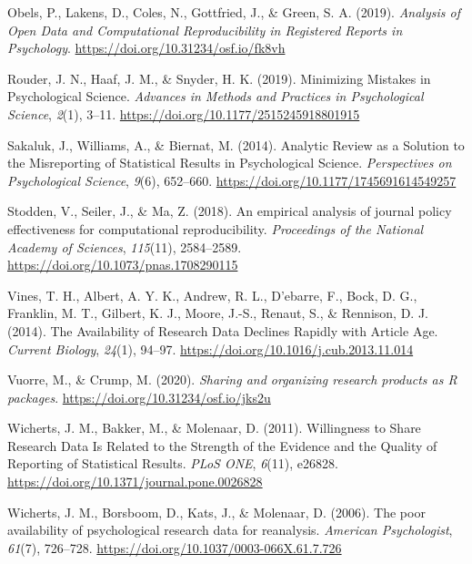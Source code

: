 \documentclass[english,,man,floatsintext]{apa6}
\begin{document}
\leavevmode\hypertarget{ref-obels2019}{}%
Obels, P., Lakens, D., Coles, N., Gottfried, J., \& Green, S. A. (2019). \emph{Analysis of Open Data and Computational Reproducibility in Registered Reports in Psychology}. \url{https://doi.org/10.31234/osf.io/fk8vh}

\leavevmode\hypertarget{ref-rouder2019}{}%
Rouder, J. N., Haaf, J. M., \& Snyder, H. K. (2019). Minimizing Mistakes in Psychological Science. \emph{Advances in Methods and Practices in Psychological Science}, \emph{2}(1), 3--11. \url{https://doi.org/10.1177/2515245918801915}

\leavevmode\hypertarget{ref-sakaluk2014}{}%
Sakaluk, J., Williams, A., \& Biernat, M. (2014). Analytic Review as a Solution to the Misreporting of Statistical Results in Psychological Science. \emph{Perspectives on Psychological Science}, \emph{9}(6), 652--660. \url{https://doi.org/10.1177/1745691614549257}

\leavevmode\hypertarget{ref-stodden2018}{}%
Stodden, V., Seiler, J., \& Ma, Z. (2018). An empirical analysis of journal policy effectiveness for computational reproducibility. \emph{Proceedings of the National Academy of Sciences}, \emph{115}(11), 2584--2589. \url{https://doi.org/10.1073/pnas.1708290115}

\leavevmode\hypertarget{ref-vines2014}{}%
Vines, T. H., Albert, A. Y. K., Andrew, R. L., D\a'ebarre, F., Bock, D. G., Franklin, M. T., Gilbert, K. J., Moore, J.-S., Renaut, S., \& Rennison, D. J. (2014). The Availability of Research Data Declines Rapidly with Article Age. \emph{Current Biology}, \emph{24}(1), 94--97. \url{https://doi.org/10.1016/j.cub.2013.11.014}

\leavevmode\hypertarget{ref-vuorre2020}{}%
Vuorre, M., \& Crump, M. (2020). \emph{Sharing and organizing research products as R packages}. \url{https://doi.org/10.31234/osf.io/jks2u}

\leavevmode\hypertarget{ref-wicherts2011}{}%
Wicherts, J. M., Bakker, M., \& Molenaar, D. (2011). Willingness to Share Research Data Is Related to the Strength of the Evidence and the Quality of Reporting of Statistical Results. \emph{PLoS ONE}, \emph{6}(11), e26828. \url{https://doi.org/10.1371/journal.pone.0026828}

\leavevmode\hypertarget{ref-wicherts2006}{}%
Wicherts, J. M., Borsboom, D., Kats, J., \& Molenaar, D. (2006). The poor availability of psychological research data for reanalysis. \emph{American Psychologist}, \emph{61}(7), 726--728. \url{https://doi.org/10.1037/0003-066X.61.7.726}
\end{document}
